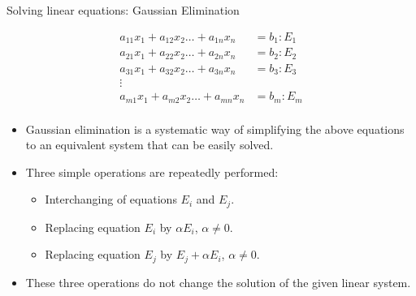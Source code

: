 \documentclass[aspectratio=169]{beamer}
\begin{document}
\begin{frame}[t]{Solving linear equations: Gaussian Elimination}
\vspace{-0.5cm}
\begin{small}
\[
\begin{split}
a_{11}x_1 + a_{12}x_2 \ldots + a_{1n}x_n & = b_1: E_1 \\
a_{21}x_1 + a_{22}x_2 \ldots + a_{2n}x_n & = b_2: E_2 \\
a_{31}x_1 + a_{32}x_2 \ldots + a_{3n}x_n & = b_3: E_3 \\
\vdots \\
a_{m1}x_1 + a_{m2}x_2 \ldots + a_{mn}x_n & = b_m: E_m \\
\end{split}
\]
\end{small}
\vspace{-0.5cm}

\begin{itemize}
\item Gaussian elimination is a systematic way of simplifying the above equations to an equivalent system that can be easily solved.  
\item Three simple operations are repeatedly performed:
\begin{itemize}
\item Interchanging of equations $E_i$ and $E_j$.
\item Replacing equation $E_i$ by $\alpha E_i$, $\alpha \neq 0$.
\item Replacing equation $E_j$ by $E_j + \alpha E_i$, $\alpha \neq 0$.
\end{itemize}
\item These three operations do not change the solution of the given linear system.
\end{itemize}
\end{frame}
\end{document}
